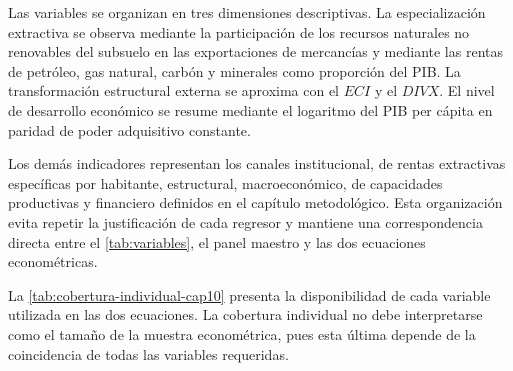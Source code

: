 \documentclass[../../TFM.tex]{subfiles}
\begin{document}
	Las variables se organizan en tres dimensiones descriptivas. La
	especialización extractiva se observa mediante la participación de los
	recursos naturales no renovables del subsuelo en las exportaciones de
	mercancías y mediante las rentas de petróleo, gas natural, carbón y minerales
	como proporción del PIB. La transformación estructural externa se aproxima
	con el $ECI$ y el $DIVX$. El nivel de desarrollo económico se
	resume mediante el logaritmo del PIB per cápita en paridad de poder
	adquisitivo constante.

	Los demás indicadores representan los canales institucional, de rentas
	extractivas específicas por habitante, estructural, macroeconómico, de
	capacidades productivas y financiero
	definidos en el capítulo metodológico. Esta organización evita repetir la
	justificación de cada regresor y mantiene una correspondencia directa entre
	el \autoref{tab:variables}, el panel maestro y las dos ecuaciones
	econométricas.

	La \autoref{tab:cobertura-individual-cap10} presenta la disponibilidad de
	cada variable utilizada en las dos ecuaciones. La cobertura individual no
	debe interpretarse como el tamaño de la muestra econométrica, pues esta
	última depende de la coincidencia de todas las variables requeridas.
\end{document}

